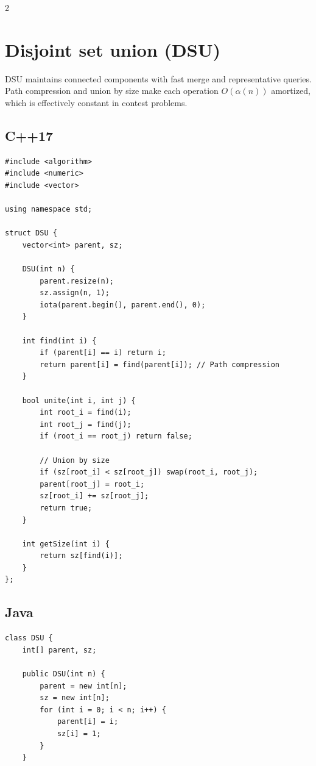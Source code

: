 \documentclass[10pt]{article}
\begin{document}
\begin{multicols}{2}

\section{Disjoint set union (DSU)}
DSU maintains connected components with fast merge and representative
queries. Path compression and union by size make each operation
$O(\alpha(n))$ amortized, which is effectively constant in contest problems.

\subsection{C++17}
\begin{framed}
\scriptsize
\begin{verbatim}
#include <algorithm>
#include <numeric>
#include <vector>

using namespace std;

struct DSU {
    vector<int> parent, sz;

    DSU(int n) {
        parent.resize(n);
        sz.assign(n, 1);
        iota(parent.begin(), parent.end(), 0);
    }

    int find(int i) {
        if (parent[i] == i) return i;
        return parent[i] = find(parent[i]); // Path compression
    }

    bool unite(int i, int j) {
        int root_i = find(i);
        int root_j = find(j);
        if (root_i == root_j) return false;

        // Union by size
        if (sz[root_i] < sz[root_j]) swap(root_i, root_j);
        parent[root_j] = root_i;
        sz[root_i] += sz[root_j];
        return true;
    }

    int getSize(int i) {
        return sz[find(i)];
    }
};
\end{verbatim}
\end{framed}

\subsection{Java}
\begin{framed}
\scriptsize
\begin{verbatim}
class DSU {
    int[] parent, sz;

    public DSU(int n) {
        parent = new int[n];
        sz = new int[n];
        for (int i = 0; i < n; i++) {
            parent[i] = i;
            sz[i] = 1;
        }
    }


\end{verbatim}
\end{framed}
\end{multicols}
\end{document}
